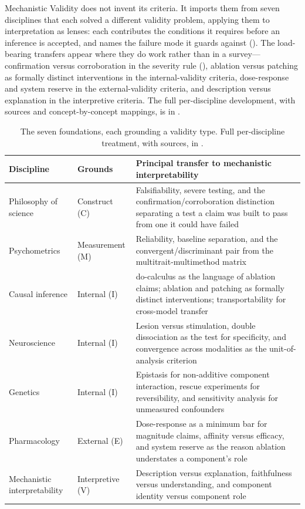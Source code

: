 \documentclass{article}
\begin{document}
Mechanistic Validity does not invent its criteria. It imports them from seven disciplines that each solved a different validity problem, applying them to interpretation as lenses: each contributes the conditions it requires before an inference is accepted, and names the failure mode it guards against (). The load-bearing transfers appear where they do work rather than in a survey---confirmation versus corroboration in the severity rule (), ablation versus patching as formally distinct interventions in the internal-validity criteria, dose-response and system reserve in the external-validity criteria, and description versus explanation in the interpretive criteria. The full per-discipline development, with sources and concept-by-concept mappings, is in .

\begin{table}[h]
\centering\small
\caption{The seven foundations, each grounding a validity type. Full per-discipline treatment, with sources, in .}
\label{tab:foundations-summary}
\renewcommand{\arraystretch}{1.15}
\begin{tabular}{@{}ll>{\raggedright\arraybackslash}p{7.2cm}@{}}
\toprule
\textbf{Discipline} & \textbf{Grounds} & \textbf{Principal transfer to mechanistic interpretability} \\
\midrule
Philosophy of science & Construct (C) & Falsifiability, severe testing, and the confirmation/corroboration distinction separating a test a claim was built to pass from one it could have failed \\
\midrule
Psychometrics & Measurement (M) & Reliability, baseline separation, and the convergent/discriminant pair from the multitrait-multimethod matrix \\
\midrule
Causal inference & Internal (I) & do-calculus as the language of ablation claims; ablation and patching as formally distinct interventions; transportability for cross-model transfer \\
\midrule
Neuroscience & Internal (I) & Lesion versus stimulation, double dissociation as the test for specificity, and convergence across modalities as the unit-of-analysis criterion \\
\midrule
Genetics & Internal (I) & Epistasis for non-additive component interaction, rescue experiments for reversibility, and sensitivity analysis for unmeasured confounders \\
\midrule
Pharmacology & External (E) & Dose-response as a minimum bar for magnitude claims, affinity versus efficacy, and system reserve as the reason ablation understates a component's role \\
\midrule
Mechanistic interpretability & Interpretive (V) & Description versus explanation, faithfulness versus understanding, and component identity versus component role \\
\bottomrule
\end{tabular}
\end{table}
\end{document}
